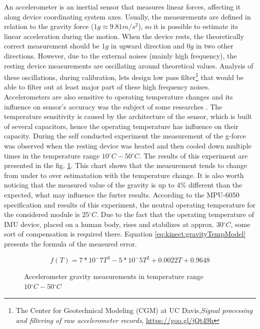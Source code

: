 \documentclass[sensors,article,submit,moreauthors,pdftex,10pt,a4paper]{mdpi}
\newcommand{\degree}{\ensuremath{{}^{\circ}}\xspace}
\begin{document}
	An accelerometer is an inertial sensor that measures linear forces, affecting it along device coordinating system axes. Usually, the measurements are defined in relation to the gravity force ($1g \approx 9.81  m/{s^2}$), so it is possible to estimate its linear acceleration during the motion. When the device rests, the theoretically correct measurement should be $1g$ in upward direction and $0g$ in two other directions. However, due to the external noises (mainly high frequency), the resting device measurements are oscillating around theoretical values. Analysis of these oscillations, during calibration, lets design low pass filter\footnote{The Center for Geotechnical Modeling (CGM) at UC Davis,\textit{Signal processing and filtering of raw accelerometer records}, \url{https://goo.gl/jQt49h}}\cite{Wang2011} that would be able to filter out at least major part of these high frequency noises. Accelerometers are also sensitive to operating temperature changes and its influence on sensor’s accuracy was the subject of some researches \cite{Schneider2006, Grigorie1996}. The temperature sensitivity is caused by the architecture of the sensor, which is built of several capacitors, hence the operating temperature has influence on their capacity. During the self conducted experiment the measurement of the g-force was observed when the resting device was heated and then cooled down multiple times in the temperature range $10\degree C - 50\degree C$. The results of this experiment are presented in the fig. \ref{fig:imu:tmep}. This chart shows that the measurement tends to change from under to over estimatation with the temperature change. It is also worth noticing that the measured value of the gravity is up to $4\%$ different than the expected, what may influence the furter results. According to the MPU-6050 specification and results of this experiment, the neutral operating temperature for the considered module is $25\degree C$. Due to the fact that the operating temperature of IMU device, placed on a human body, rises and stabilizes at approx. $30 \degree C$, some sort of compensation is required there. Equation \ref{eq:kinect:gravityTempModel} presents the formula of the measured error.
	
	\begin{equation}
		f(T) = 7*10^-7 T^3 - 5*10^-5 T^2 + 0.0022T + 0.9648
		\label{eq:kinect:gravityTempModel}
	\end{equation}
	
	\begin{figure}[H]
		\centering
			
		\caption{Accelerometer gravity measurements in temperature range $10\degree C - 50\degree C$}
		\label{fig:imu:tmep}
	\end{figure}
	
\end{document}
